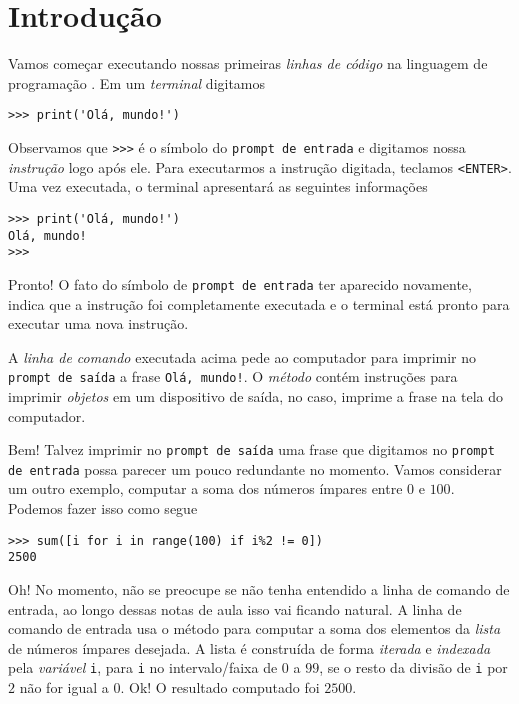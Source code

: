 

\chapter{Introdução}\label{cap_intro}

Vamos começar executando nossas primeiras \emph{linhas de código} na linguagem de programação {\python}. Em um \emph{terminal} {\python} digitamos

\begin{lstlisting}
>>> print('Olá, mundo!')
\end{lstlisting}

Observamos que \lstinline+>>>+ é o símbolo do \lstinline+prompt de entrada+ e digitamos nossa \emph{instrução} logo após ele. Para executarmos a instrução digitada, teclamos \lstinline+<ENTER>+. Uma vez executada, o terminal apresentará as seguintes informações

\begin{lstlisting}
>>> print('Olá, mundo!')
Olá, mundo!
>>> 
\end{lstlisting}

Pronto! O fato do símbolo de \lstinline+prompt de entrada+ ter aparecido novamente, indica que a instrução foi completamente executada e o terminal está pronto para executar uma nova instrução.

A \emph{linha de comando} executada acima pede ao computador para imprimir no \lstinline+prompt de saída+ a frase \lstinline+Olá, mundo!+. O \emph{método} {\PYTHONprint} contém instruções para imprimir \emph{objetos} em um dispositivo de saída, no caso, imprime a frase na tela do computador.

Bem! Talvez imprimir no \lstinline+prompt de saída+ uma frase que digitamos no \lstinline+prompt de entrada+ possa parecer um pouco redundante no momento. Vamos considerar um outro exemplo, computar a soma dos números ímpares entre $0$ e $100$. Podemos fazer isso como segue

\begin{lstlisting}
>>> sum([i for i in range(100) if i%2 != 0])
2500
\end{lstlisting}

Oh! No momento, não se preocupe se não tenha entendido a linha de comando de entrada, ao longo dessas notas de aula isso vai ficando natural. A linha de comando de entrada usa o método {\PYTHONsum} para computar a soma dos elementos da \emph{lista} de números ímpares desejada. A lista é construída de forma \emph{iterada} e \emph{indexada} pela \emph{variável} \lstinline+i+, para \lstinline+i+ no intervalo/faixa de $0$ a $99$, se o resto da divisão de \lstinline+i+ por $2$ não for igual a $0$. Ok! O resultado computado foi $2500$.

